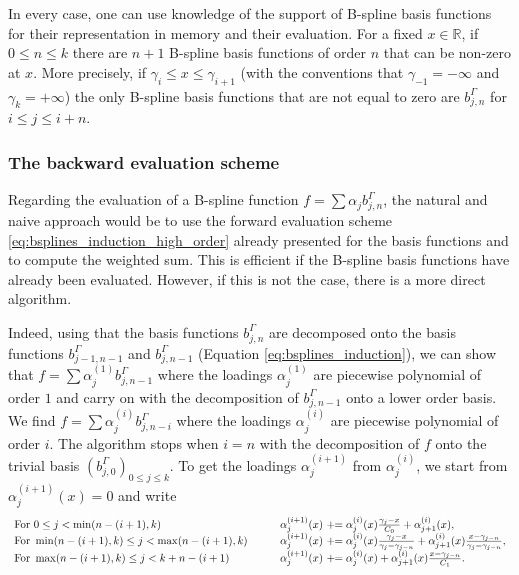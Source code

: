 \documentclass[a4paper]{article}
\newcommand{\1}{\textbf{1}}
\newcommand{\R}{\mathbb{R}}
\begin{document}
\par \noindent In every case, one can use knowledge of the support of B-spline basis functions for their representation in memory and their evaluation. For a fixed $x \in \R$, if $0 \leq n \leq k$ there are $n+1$ B-spline basis functions of order $n$ that can be non-zero at $x$. More precisely, if $\gamma_i \leq x \leq \gamma_{i + 1}$ (with the conventions that $\gamma_{-1} = -\infty$ and $\gamma_k = +\infty$) the only B-spline basis functions that are not equal to zero are $b^\Gamma_{j,n}$ for $i \leq j \leq i + n$. 
\subsubsection*{The backward evaluation scheme}
\par \noindent Regarding the evaluation of a B-spline function $f = \sum \alpha_j b^\Gamma_{j, n}$, the natural and naive approach would be to use the forward evaluation scheme \eqref{eq:bsplines_induction_high_order} already presented for the basis functions and to compute the weighted sum. This is efficient if the B-spline basis functions have already been evaluated. However, if this is not the case, there is a more direct algorithm.
\par Indeed, using that the basis functions $b^\Gamma_{j, n}$ are decomposed onto the basis functions $b^\Gamma_{j-1, n-1}$ and $b^\Gamma_{j, n-1}$ (Equation \eqref{eq:bsplines_induction}), we can show that $f = \sum \alpha^{(1)}_j b^\Gamma_{j, n - 1}$ where the loadings $\alpha^{(1)}_j$ are piecewise polynomial of order $1$ and carry on with the decomposition of $b^\Gamma_{j, n - 1}$ onto a lower order basis. We find $f = \sum \alpha^{(i)}_j b^\Gamma_{j, n - i}$ where the loadings $\alpha^{(i)}_j$ are piecewise polynomial of order $i$. The algorithm stops when $i=n$ with the decomposition of $f$ onto the trivial basis $\left(b^\Gamma_{j,0}\right)_{0 \leq j \leq k}$. To get the loadings $\alpha^{(i+1)}_j$ from $\alpha^{(i)}_j$, we start from $ \alpha_j^{(i+1)}(x) = 0$ and write
\begin{equation}\label{eq:backward_method}
\begin{array}{ll}
\textnormal{For} \ 0 \leq j < \min(n - (i + 1),k) & \qquad \alpha_j^{(i+1)}(x) \ +\!\!= \alpha_j^{(i)}(x) \frac{\gamma_j -x}{C_0} + \alpha_{j+1}^{(i)}(x),\\
\textnormal{For} \ \min(n - (i + 1),k) \leq j < \max(n - (i + 1),k) & \qquad \alpha_j^{(i+1)}(x) \ +\!\!= \alpha_j^{(i)}(x) \frac{\gamma_j - x}{\gamma_j - \gamma_{j-n}} + \alpha_{j+1}^{(i)}(x) \frac{x - \gamma_{j-n}}{\gamma_j - \gamma_{j-n}},\\
\textnormal{For} \ \max(n - (i + 1),k) \leq j < k + n - (i + 1) & \qquad \alpha_j^{(i+1)}(x) \ +\!\!= \alpha_j^{(i)}(x) + \alpha_{j+1}^{(i)}(x) \frac{x - \gamma_{j-n}}{C_1}. 
\end{array}
\end{equation}
\end{document}

